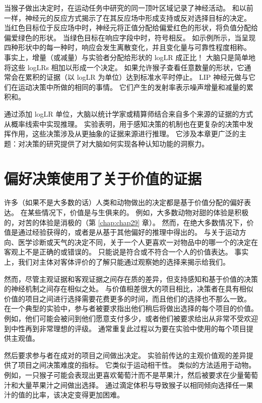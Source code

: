 当猴子做出决定时，在运动任务中研究的同一顶叶区域记录了神经活动。 和以前一样，神经元的反应方式揭示了在其反应场中形成支持或反对选择目标的决定。 当红色目标位于反应场中时，神经元将正值分配给偏爱红色的形状，将负值分配给偏爱绿色的形状。 当绿色目标在响应字段中时，符号相反。 如示例所示，当呈现四种形状中的每一种时，响应会发生离散变化，并且变化量与可靠性程度相称。 事实上，增量（或减量）与实验者分配给形状的 logLR 成正比！ 大脑只是简单地将这些 logLRs 相加以形成一个决定。 如果允许猴子查看任意数量的形状，它通常会在累积的证据（以 logLR 为单位）达到标准水平时停止。 LIP 神经元做与它们在运动决策中所做的相同的事情。 它们产生的发射率表示噪声增量和减量的累积和。

通过添加 logLR 单位，大脑以统计学家或精算师结合来自多个来源的证据的方式从概率线索中实现推理。 实验表明，用于感知决策的机制也在更复杂的决策中发挥作用，这些决策涉及从更抽象的证据来源进行推理。 它涉及本章更广泛的主题：对决策的研究提供了对大脑如何实现各种认知功能的洞察力。

\section{偏好决策使用了关于价值的证据}

许多（如果不是大多数的话）人类和动物做出的决定都是基于价值分配的偏好表达。 在某些情况下，价值是与生俱来的。 例如，大多数动物对甜的体验是积极的，对苦的体验是消极的（第 \ref{chap:chap29} 章）。 然而，在绝大多数情况下，价值是通过经验获得的，或者是从基于其他偏好的推理中得出的。 与关于运动方向、医学诊断或天气的决定不同，关于一个人更喜欢一对物品中的哪一个的决定在客观上不是正确的或错误的。 只能说是符合或不符合一个人的价值表达。 事实上，我们对主体对客体评价的了解只能通过观察她的选择来揭示给我们。

然而，尽管主观证据和客观证据之间存在质的差异，但支持感知和基于价值的决策的神经机制之间存在相似之处。 与价值相差很大的项目相比，决策者在具有相似价值的项目之间进行选择需要花费更多的时间，而且他们的选择也不那么一致。 在一个典型的实验中，参与者被要求指出他们稍后将做出选择的每个项目的价值。 例如，他们可能会被问到他们愿意支付多少，或者他们被要求给出从非常不受欢迎到中性再到非常理想的评级。 通常重复此过程以为要在实验中使用的每个项目提供主观值。

然后要求参与者在成对的项目之间做出决定。 实验前传达的主观价值观的差异提供了项目之间决策难度的指标。 它类似于运动相干性。 类似的方法适用于动物。 例如，一只猴子可能会表现出更喜欢葡萄汁而不是苹果汁，然后被要求在少量葡萄汁和大量苹果汁之间做出选择。 通过滴定体积与导致猴子以相同倾向选择任一果汁的值的比率，该决定变得更加困难。

